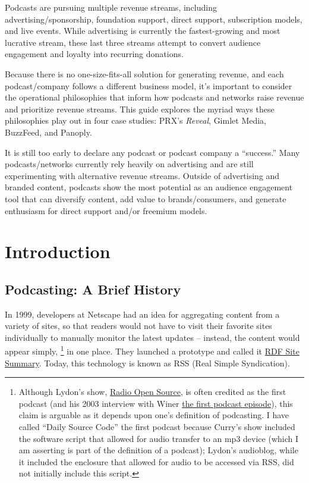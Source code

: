 \documentclass[notoc, symmetric, nobib, nols]{towcenter-guideto-book}
\begin{document}
Podcasts are pursuing multiple revenue streams, including advertising/sponsorship, foundation support, direct support, subscription models, and live events. While advertising is currently the fastest-growing and most lucrative stream, these last three streams attempt to convert audience engagement and loyalty into recurring donations. 

Because there is no one-size-fits-all solution for generating revenue, and each podcast/company follows a different business model, it's important to consider the operational philosophies that inform how podcasts and networks raise revenue and prioritize revenue streams. This guide explores the myriad ways these philosophies play out in four case studies: PRX's \textit{Reveal}, Gimlet Media, BuzzFeed, and Panoply. 

It is still too early to declare any podcast or podcast company a ``success.'' Many podcasts/networks currently rely heavily on advertising and are still experimenting with alternative revenue streams. Outside of advertising and branded content, podcasts show the most potential as an audience engagement tool that can diversify content, add value to brands/consumers, and generate enthusiasm for direct support and/or freemium models. 

\chapter{Introduction}

\section{Podcasting: A Brief History}

In 1999, developers at Netscape had an idea for aggregating content from a variety of sites, so that readers would not have to visit their favorite sites individually to manually monitor the latest updates -- instead, the content would appear simply, \footnote{Although Lydon's show, \href{http://radioopensource.org/about/}{Radio Open Source}, is often credited as the first podcast (and his 2003 interview with Winer \href{http://blogs.harvard.edu/lydondev/2003/07/09/spoken-word-a-few-good-bloggers/}{the first podcast episode}), this claim is arguable as it depends upon one’s definition of podcasting. I have called ``Daily Source Code'' the first podcast because Curry's show included the software script that allowed for audio transfer to an mp3 device (which I am asserting is part of the definition of a podcast); Lydon's audioblog, while it included the enclosure that allowed for audio to be accessed via RSS, did not initially include this script.} in one place.\autocite{WhatisRSS} They launched a prototype and called it \href{https://en.wikipedia.org/wiki/RSS}{RDF Site Summary}.\autocite{RSSWiki} Today, this technology is known as RSS (Real Simple Syndication). 
\end{document}
